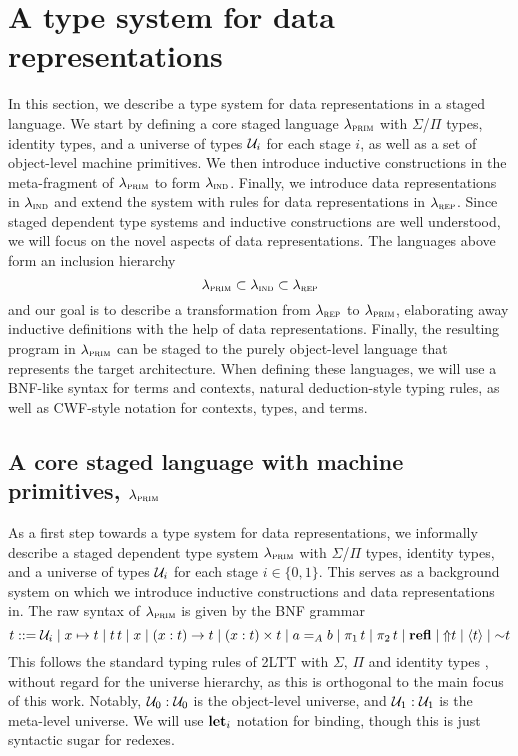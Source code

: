 \section{A type system for data representations}\label{sec:type-system}

In this section, we describe a type system for data representations in a staged
language. We start by defining a core staged language $\lambdaprim$ with
$\Sigma$/$\Pi$ types, identity types, and a universe of types $\univ_i$ for
each stage $i$, as well as a set of object-level machine primitives. We then
introduce inductive constructions in the meta-fragment of $\lambdaprim$ to form
$\lambdaind$. Finally, we introduce data representations in $\lambdaind$ and
extend the system with rules for data representations in $\lambdarep$. Since
staged dependent type systems and inductive constructions are well understood,
we will focus on the novel aspects of data representations. The languages above
form an inclusion hierarchy
\[
  \lambdaprim \subset \lambdaind \subset \lambdarep
\]
and our goal is to describe a transformation from $\lambdarep$ to
$\lambdaprim$, elaborating away inductive definitions with the help of data
representations. Finally, the resulting program in $\lambdaprim$ can be staged
to the purely object-level language that represents the target architecture.
When defining these languages, we will use a BNF-like syntax for terms and
contexts, natural deduction-style typing rules, as well as CWF-style notation
for contexts, types, and terms.

\subsection{A core staged language with machine primitives, $\lambdaprim$}\label{sub:lambdaprim}

As a first step towards a type system for data representations, we informally
describe a staged dependent type system $\lambdaprim$ with $\Sigma$/$\Pi$
types, identity types, and a universe of types $\univ_i$ for each stage $i \in
  \{0, 1\}$. This serves as a background system on which we introduce inductive
constructions and data representations in. The raw syntax of $\lambdaprim$ is
given by the BNF grammar
\[
  t ::= \univ_i \mid x \mapsto t \mid t \, t \mid x \mid (x : t) \to t \mid (x : t) \times t \mid
  \Id{A}{a}{b} \mid \pi_1 \, t \mid \pi_2 \, t \mid \kwd{refl} \mid \lift t \mid \quot t \mid \splice t
\]
This follows the standard typing rules of 2LTT with $\Sigma$, $\Pi$ and
identity types \cite{Kovacs2022-vb}, without regard for the universe hierarchy,
as this is orthogonal to the main focus of this work. Notably, $\univ_0 :
  \univ_0$ is the object-level universe, and $\univ_1 : \univ_1$ is the
meta-level universe. We will use $\kwd{let}_i$ notation for binding, though
this is just syntactic sugar for redexes.

